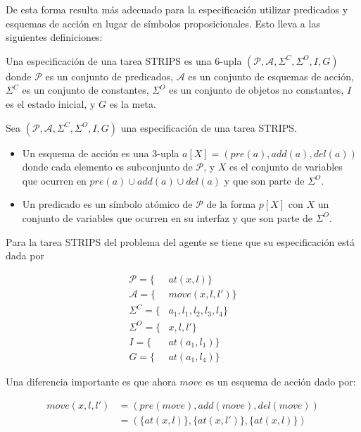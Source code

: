 De esta forma resulta más adecuado para la especificación utilizar predicados y
esquemas de acción en lugar de símbolos proposicionales. Esto lleva a las
siguientes definiciones:

\begin{mydef}
    Una especificación de una tarea STRIPS es una 6-upla $(\mathcal{P},
    \mathcal{A}, \Sigma^{C}, \Sigma^{O}, I, G)$  donde $\mathcal{P}$ es un
    conjunto de predicados, $\mathcal{A}$ es un conjunto de esquemas de acción,
    $\Sigma^{C}$ es un conjunto de constantes, $\Sigma^{O}$ es un conjunto de
    objetos no constantes, $I$ es el estado inicial, y $G$ es la meta.
\end{mydef}

\begin{mydef}
    Sea $(\mathcal{P}, \mathcal{A}, \Sigma^{C}, \Sigma^{O}, I, G)$ una
    especificación de una tarea STRIPS.

    \begin{itemize}
        \item Un esquema de acción es una 3-upla $a[X] = (pre(a), add(a),
        del(a))$ donde cada elemento es subconjunto de $\mathcal{P}$, y $X$ es el
        conjunto de variables que ocurren en $pre(a) \cup add(a) \cup del(a)$ y
        que son parte de $\Sigma^{O}$.
        \item Un predicado es un símbolo atómico de $\mathcal{P}$ de la forma
        $p[X]$ con $X$ un conjunto de variables que ocurren en su interfaz y
        que son parte de $\Sigma^{O}$.
    \end{itemize}
\end{mydef}

Para la tarea STRIPS del problema del agente se tiene que su especificación está
dada por

\begin{align*}
    \mathcal{P} = \{&at(x, l)\} \\
    \mathcal{A} = \{&move(x, l, l')\} \\
    \Sigma^{C} = \{&a_1, l_1, l_2, l_3, l_4\} \\
    \Sigma^{O} = \{&x, l, l'\} \\
    I = \{&at(a_1, l_1)\} \\
    G = \{&at(a_1, l_4)\}
\end{align*}

Una diferencia importante es que ahora $move$ es un esquema de acción dado por:

\begin{align*}
    move(x, l, l') &= (pre(move), add(move), del(move)) \\
                   &= (\{at(x, l)\}, \{at(x, l')\},\{at(x, l)\})
\end{align*}

